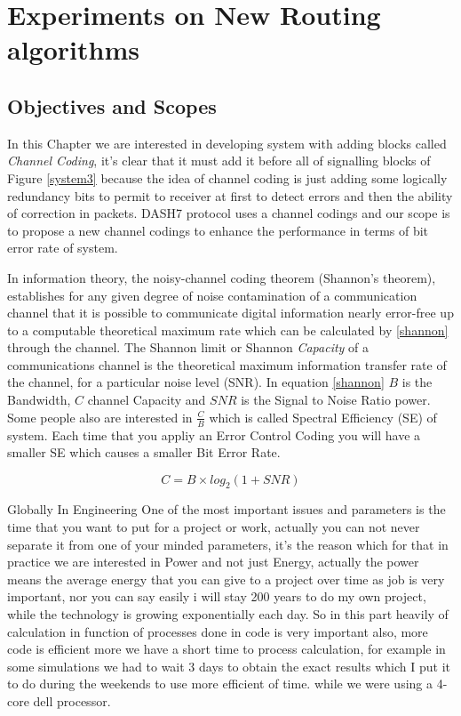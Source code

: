 
\chapter{Experiments on New Routing algorithms} %

\label{coding}


\section{Objectives and Scopes}
In this Chapter we are interested in developing system with adding blocks called \textit{Channel Coding}, it's clear that it must add it before all of signalling blocks of Figure \ref{system3} because the idea of channel coding is just adding some logically redundancy bits to permit to receiver at first to detect errors and then the ability of correction in packets. DASH7 protocol uses a channel codings and our scope is to propose a new channel codings to enhance the performance in terms of bit error rate of system.

In information theory, the noisy-channel coding theorem (Shannon's theorem), establishes for any given degree of noise contamination of a communication channel that it is possible to communicate digital information nearly error-free up to a computable theoretical maximum rate which can be calculated by \ref{shannon} through the channel. The Shannon limit or Shannon \textit{Capacity} of a communications channel is the theoretical maximum information transfer rate of the channel, for a particular noise level (SNR). In equation \ref{shannon} $B$ is the Bandwidth, $C$ channel Capacity and $SNR$ is the Signal to Noise Ratio power. Some people also are interested in $\frac{C}{B}$ which is called Spectral Efficiency (SE) of system. Each time that you appliy an Error Control Coding you will have a smaller SE which causes a smaller Bit Error Rate.  


\begin{equation} \label{shannon}
C = B \times log_{2}(1+SNR)
\end{equation}

Globally In Engineering One of the most important issues and parameters is the time that you want to put for a project or work, actually you can not never separate it from one of your minded parameters, it's the reason which for that in practice we are interested in Power and not just Energy, actually the power means the average energy that you can give to a project over time as job is very important, nor you can say easily i will stay 200 years to do my own project, while the technology is growing exponentially each day. So in this part heavily of calculation in function of processes done in code is very important also, more code is efficient more we have a short time to process calculation, for example in some  simulations we had to wait 3 days to obtain the exact results which I put it to do during the weekends to use more efficient of time. while we were using a 4-core dell processor.  
